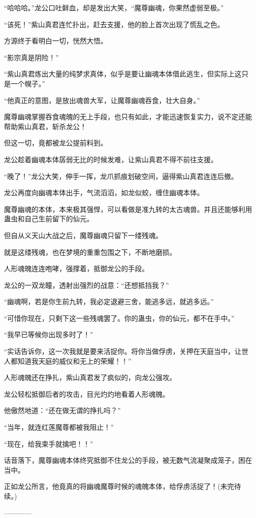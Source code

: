 \begin{this_body}
“哈哈哈。”龙公口吐鲜血，却是发出大笑，“魔尊幽魂，你果然虚弱至极。”

“该死！”紫山真君连忙扑出，赶去支援，他的脸上首次出现了慌乱之色。

方源终于看明白一切，恍然大悟。

“影宗真是阴险！”

“紫山真君炼出大量的纯梦求真体，似乎是要让幽魂本体借此逃生，但实际上这只是一个幌子。”

“他真正的意图，是放出魂兽大军，让魔尊幽魂吞食，壮大自身。”

魔尊幽魂掌握吞食魂魄的无上手段，也只有如此，才能迅速恢复实力，说不定还能帮助紫山真君，斩杀龙公！

但这一切，竟都被龙公提前料到。

龙公趁着幽魂本体孱弱无比的时候发难，让紫山真君不得不前往支援。

“晚了！”龙公大笑，伸手一挥，龙爪抓痕划破空间，逼得紫山真君连连后撤。

龙公再度向幽魂本体出手，气流滔滔，如龙似蛟，缠住幽魂本体。

魔尊幽魂的本体，本来极其强悍，可以看做是准九转的太古魂兽。并且还能够利用蛊虫和自己生前留下的仙元。

但自从义天山大战之后，魔尊幽魂只留下一缕残魂。

就是这缕残魂，也在梦境的重重包围之下，不断地磨损。

人形魂魄连连咆哮，强撑着，抵御龙公的手段。

龙公的一双龙瞳，透射出强烈的战意：“还想抵挡我？”

“幽魂啊，若是你生前九转，我必定退避三舍，能逃多远，就逃多远。”

“可惜你现在，只剩下这一些残魂罢了。你的蛊虫，你的仙元，都不在手中。”

“我早已等候你出现多时了！”

“实话告诉你，这一次我就是要来活捉你。将你当做俘虏，关押在天庭当中，让世人都知道我天庭的威仪和无上的荣耀！！”

人形魂魄还在挣扎，紫山真君发了疯似的，向龙公强攻。

龙公轻松抵御后者的攻击，目光灼灼地看着人形魂魄。

他傲然地道：“还在做无谓的挣扎吗？”

“当年，就连红莲魔尊都被我阻止！”

“现在，给我束手就擒吧！！”

话音落下，魔尊幽魂本体终究抵御不住龙公的手段，被无数气流凝聚成笼子，困在当中。

正如龙公所言，他竟真的将幽魂魔尊时候的魂魄本体，给俘虏活捉了！(未完待续。)

------------

\end{this_body}

